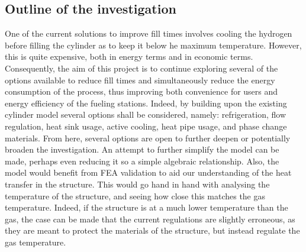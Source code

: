 \subsection{Outline of the investigation}
	One of the current solutions to improve fill times involves cooling the hydrogen before filling the cylinder as to keep it below he maximum temperature. However, this is quite expensive, both in energy terms and in economic terms. Consequently, the aim of this project is to continue exploring several of the options available to reduce fill times and simultaneously reduce the energy consumption of the process, thus improving both convenience for users and energy efficiency of the fueling stations. Indeed, by building upon the existing cylinder model several options shall be considered, namely: refrigeration, flow regulation, heat sink usage, active cooling, heat pipe usage, and phase change materials.  From here, several options are open to further deepen or potentially broaden the investigation. An attempt to further simplify the model can be made, perhaps even reducing it so a simple algebraic relationship. Also, the model would benefit from FEA validation to aid our understanding of the heat transfer in the structure. This would go hand in hand with analysing the temperature of the structure, and seeing how close this matches the gas temperature. Indeed, if the structure is at a much lower temperature than the gas, the case can be made that the current regulations are slightly erroneous, as they are meant to protect the materials of the structure, but instead regulate the gas temperature. 





